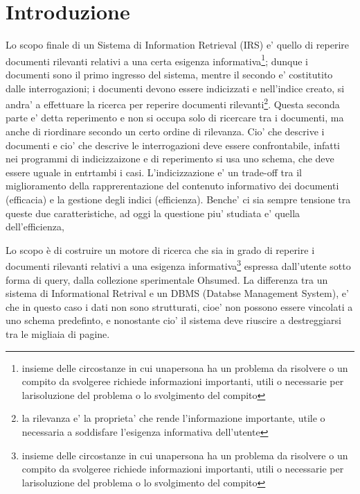 \documentclass[runningheads]{llncs}
\begin{document}
\section{Introduzione}
\label{sec:introduzione}
Lo scopo finale di un Sistema di Information Retrieval (IRS) e' quello di reperire documenti rilevanti relativi a una certa esigenza informativa\footnote{insieme delle circostanze in cui unapersona ha un problema da risolvere o un compito da svolgeree richiede informazioni importanti, utili o necessarie per larisoluzione del problema o lo svolgimento del compito}; dunque i documenti sono il primo ingresso del sistema, mentre il secondo e' costitutito dalle interrogazioni; i documenti devono essere indicizzati e nell'indice creato, si andra' a effettuare la ricerca per reperire documenti rilevanti\footnote{la rilevanza e' la proprieta' che rende l'informazione importante, utile o necessaria a soddisfare l'esigenza informativa dell'utente}. Questa seconda parte e' detta reperimento e non si occupa solo di ricercare tra i documenti, ma anche di riordinare secondo un certo ordine di rilevanza. Cio' che descrive i documenti e cio' che descrive le interrogazioni deve essere confrontabile, infatti nei programmi di indicizzaizone e di reperimento si usa uno schema, che deve essere uguale in entrtambi i casi.
L'indicizzazione e' un trade-off tra il  miglioramento della rapprerentazione del contenuto informativo dei documenti (efficacia) e la gestione degli indici (efficienza). Benche' ci sia sempre tensione tra queste due caratteristiche, ad oggi la questione piu' studiata e' quella dell'efficienza,

Lo scopo è di costruire un motore di ricerca che sia in grado di reperire i documenti rilevanti relativi a una esigenza informativa\footnote{insieme delle circostanze in cui unapersona ha un problema da risolvere o un compito da svolgeree richiede informazioni importanti, utili o necessarie per larisoluzione del problema o lo svolgimento del compito}
espressa dall'utente sotto forma di query, dalla collezione sperimentale Ohsumed.
La differenza tra un sistema di Informational Retrival e un DBMS (Databse Management System), e' che in questo caso i dati non sono strutturati, cioe' non possono essere vincolati a uno schema predefinto, e nonostante cio' il sistema deve riuscire a destreggiarsi tra le migliaia di pagine.
\end{document}
